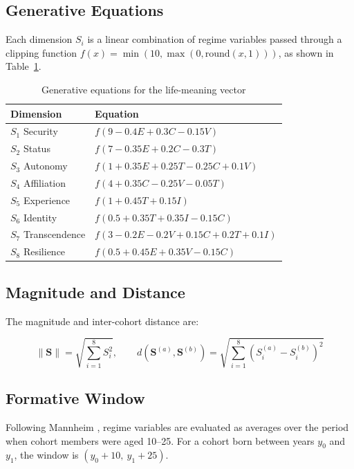\documentclass[conference]{IEEEtran}
\begin{document}
\subsection{Generative Equations}

Each dimension $S_i$ is a linear combination of regime variables passed through a clipping function $f(x) = \min(10, \max(0, \mathrm{round}(x, 1)))$, as shown in Table~\ref{tab:equations}.

\begin{table}[htbp]
\caption{Generative equations for the life-meaning vector}
\label{tab:equations}
\begin{tabular}{ll}
\toprule
Dimension & Equation \\
\midrule
$S_1$ Security & $f(9 - 0.4E + 0.3C - 0.15V)$ \\
$S_2$ Status & $f(7 - 0.35E + 0.2C - 0.3T)$ \\
$S_3$ Autonomy & $f(1 + 0.35E + 0.25T - 0.25C + 0.1V)$ \\
$S_4$ Affiliation & $f(4 + 0.35C - 0.25V - 0.05T)$ \\
$S_5$ Experience & $f(1 + 0.45T + 0.15I)$ \\
$S_6$ Identity & $f(0.5 + 0.35T + 0.35I - 0.15C)$ \\
$S_7$ Transcendence & $f(3 - 0.2E - 0.2V + 0.15C + 0.2T + 0.1I)$ \\
$S_8$ Resilience & $f(0.5 + 0.45E + 0.35V - 0.15C)$ \\
\bottomrule
\end{tabular}
\end{table}

\subsection{Magnitude and Distance}

The magnitude and inter-cohort distance are:

\begin{equation}
\|\mathbf{S}\| = \sqrt{\sum_{i=1}^{8} S_i^{2}}, \qquad
d(\mathbf{S}^{(a)}, \mathbf{S}^{(b)}) = \sqrt{\sum_{i=1}^{8} \left(S_i^{(a)} - S_i^{(b)}\right)^2}
\end{equation}

\subsection{Formative Window}

Following Mannheim \cite{mannheim1928}, regime variables are evaluated as averages over the period when cohort members were aged 10--25. For a cohort born between years $y_0$ and $y_1$, the window is $(y_0 + 10,\ y_1 + 25)$.
\end{document}
